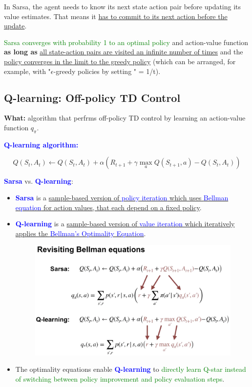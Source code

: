 \documentclass[12pt, a4paper]{article}
\begin{document}
In Sarsa, the agent needs to know its next state action pair before updating its value estimates. That means it \uline{has to commit to its next action before the update}.

\textcolor{Green}{Sarsa converges with probability 1 to an optimal policy} and action-value function \textbf{as long as} \uline{all state-action pairs are visited an infinite number of times} and the \uline{policy converges in the limit to the greedy policy} (which can be arranged, for example, with "$\epsilon$-greedy policies by setting " = 1/t).














\subsection{Q-learning: Off-policy TD Control}\label{q-learning}

\textbf{What:} algorithm that perfrms off-policy TD control by learning an action-value function $q_\pi$.

\textbf{\textcolor{blue}{Q-learning algorithm:}}

$$
Q(S_t, A_t) \leftarrow Q(S_t, A_t) + \alpha (R_{t+1} + \gamma \max_a Q(S_{t+1}, a) - Q(S_t, A_t))
$$


\textcolor{blue}{\textbf{Sarsa}} vs. \textcolor{blue}{\textbf{Q-learning}}:

\begin{itemize}
  \item \textcolor{blue}{\textbf{Sarsa}} is a \uline{sample-based version of \textcolor{blue}{policy iteration} which uses \textcolor{blue}{Bellman equation} for action values, that each depend on a fixed policy}.
  \item \textcolor{blue}{\textbf{Q-learning}} is a \uline{sample-based version of \textcolor{blue}{value iteration} which iteratively applies the \textcolor{blue}{Bellman's Optimality Equation}}.
  \begin{figure}[H]
    \centering
      \includegraphics[width=0.8\columnwidth]{images/bellman-equation-sarsa-qlearning.png}
      \label{fig:bellman-equation-sarsa-qlearning}
  \end{figure}
  \item The optimality equations enable \textcolor{blue}{\textbf{Q-learning}} to \textcolor{Green}{directly learn Q-star instead of switching between policy improvement and policy evaluation steps}.
\end{itemize}
\end{document}
